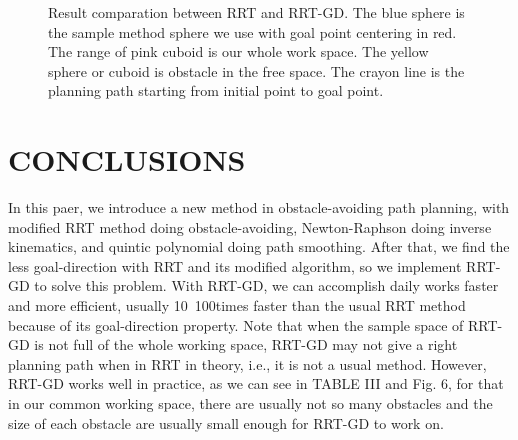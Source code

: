 \documentclass[letterpaper, 10 pt, conference]{ieeeconf}  %
\begin{document}
\begin{figure}[thpb]
      \centering
      
      \caption{Result comparation between RRT and RRT-GD. The blue sphere is the sample method sphere we use with goal point centering in red. The range of pink cuboid is our whole work space. The yellow sphere or cuboid is obstacle in the free space. The crayon line is the planning path starting from initial point to goal point. }
      \label{figurelabe6}
\end{figure}

\section{CONCLUSIONS}

In this paer, we introduce a new method in obstacle-avoiding path planning, with modified RRT method doing obstacle-avoiding, Newton-Raphson doing inverse kinematics, and quintic polynomial doing path smoothing. After that, we find the less goal-direction with RRT and its modified algorithm, so we implement RRT-GD to solve this problem. With RRT-GD, we can accomplish daily works faster and more efficient, usually 10~100times faster than the usual RRT method because of its goal-direction property. Note that when the sample space of RRT-GD is not full of the whole working space, RRT-GD may not give a right planning path when in RRT in theory, i.e., it is not a usual method. However, RRT-GD works well in practice, as we can see in TABLE III and Fig. 6, for that in our common working space, there are usually not so many obstacles and the size of each obstacle are usually small enough for RRT-GD to work on.

\addtolength{\textheight}{-12cm}   %
\end{document}
